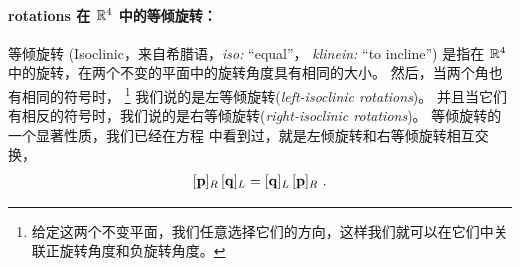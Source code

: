 \paragraph{rotations 在 ${\mathbb R}^4$ 中的等倾旋转：} 
%
等倾旋转 (Isoclinic，来自希腊语，\emph{iso:} ``equal''， \emph{klinein:} ``to incline'') 是指在 ${\mathbb R}^4$ 中的旋转，在两个不变的平面中的旋转角度具有相同的大小。
然后，当两个角也有相同的符号时，%
\footnote{给定这两个不变平面，我们任意选择它们的方向，这样我们就可以在它们中关联正旋转角度和负旋转角度。}
我们说的是左等倾旋转(\emph{left-isoclinic rotations})。 
并且当它们有相反的符号时，我们说的是右等倾旋转(\emph{right-isoclinic rotations})。
%
等倾旋转的一个显著性质，我们已经在方程  中看到过，就是左倾旋转和右等倾旋转相互交换，
\begin{align}
 [{\bf p}]_R\,[{\bf q}]_L = [{\bf q}]_L\,[{\bf p}]_R~. \label{equ:isoclinic_commute}
\end{align}

